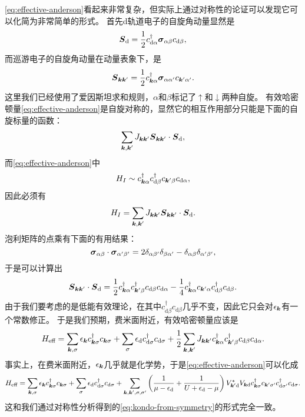 \documentclass[hyperref, UTF8, a4paper]{ctexart}
\begin{document}
\eqref{eq:effective-anderson}看起来非常复杂，但实际上通过对称性的论证可以发现它可以化简为非常简单的形式。
首先d轨道电子的自旋角动量显然是
\[
    {\vb*{S}}_\text{d} = \frac{1}{2} {c}_{\text{d} \alpha}^\dagger \vb*{\sigma}_{\alpha \beta} {c}_{\text{d} \beta},
\]
而巡游电子的自旋角动量在动量表象下，是
\[
    {\vb*{S}}_{\vb*{k} \vb*{k}'} = \frac{1}{2} {c}^\dagger_{\vb*{k} \alpha} \vb*{\sigma}_{\alpha \alpha'} {c}_{\vb*{k}' \alpha'}.
\]
这里我们已经使用了爱因斯坦求和规则，$\alpha$和$\beta$标记了$\uparrow$和$\downarrow$两种自旋。
有效哈密顿量\eqref{eq:effective-anderson}是自旋对称的，显然它的相互作用部分只能是下面的自旋标量的函数：
\[
    \sum_{\vb*{k}, \vb*{k}'} J_{\vb*{k} \vb*{k}'} {\vb*{S}}_{\vb*{k} \vb*{k}'} \cdot {\vb*{S}}_\text{d},
\]
而\eqref{eq:effective-anderson}中
\[
    {H}_I \sim {c}^\dagger_{\vb*{k} \alpha} {c}^\dagger_{\text{d} \beta} {c}_{\vb*{k}' \beta} {c}_{\text{d} \alpha},
\]
因此必须有
\[
    {H}_I = \sum_{\vb*{k}, \vb*{k}'} J_{\vb*{k} \vb*{k}'} {\vb*{S}}_{\vb*{k} \vb*{k}'} \cdot {\vb*{S}}_\text{d}.
\]
泡利矩阵的点乘有下面的有用结果：
\[
    \vb*{\sigma}_{\alpha \beta} \cdot \vb*{\sigma}_{\alpha' \beta'} = 2 \delta_{\alpha \beta'} \delta_{\beta \alpha'} - \delta_{\alpha \beta} \delta_{\alpha' \beta'},
\]
于是可以计算出
\[
    {\vb*{S}}_{\vb*{k} \vb*{k}'} \cdot {\vb*{S}}_\text{d} = \frac{1}{2} {c}^\dagger_{\vb*{k} \alpha} {c}^\dagger_{\vb*{k}' \beta} {c}_{\text{d} \beta} {c}_{\text{d} \alpha} - \frac{1}{4} {c}^\dagger_{\vb*{k} \alpha} {c}_{\vb*{k}' \alpha} {c}^\dagger_{\text{d} \beta} {c}_{\text{d} \beta}.
\]
由于我们要考虑的是低能有效理论，在其中${c}^\dagger_{\text{d} \beta} {c}_{\text{d} \beta}$几乎不变，因此它只会对$\epsilon_{\vb*{k}}$有一个常数修正。
于是我们预期，费米面附近，有效哈密顿量应该是
\begin{equation}
    {H}_\text{eff} = \sum_{\vb*{k}, \sigma} \epsilon_{\vb*{k}} {c}_{\vb*{k}\sigma}^\dagger {c}_{\vb*{k} \sigma} + \sum_\sigma \epsilon_\text{d} {c}_{\text{d}\sigma}^\dagger {c}_{\text{d} \sigma} + \frac{1}{2} \sum_{\vb*{k}, \vb*{k}'} J_{\vb*{k} \vb*{k}'} {c}^\dagger_{\vb*{k} \alpha} {c}^\dagger_{\vb*{k}' \beta} {c}_{\text{d} \beta} {c}_{\text{d} \alpha}.
    \label{eq:kondo-from-symmetry}
\end{equation}
事实上，在费米面附近，$\epsilon_{\vb*{k}}$几乎就是化学势，于是\eqref{eq:effective-anderson}可以化成
\[
    {H}_\text{eff} = \sum_{\vb*{k}, \sigma} \epsilon_{\vb*{k}} {c}_{\vb*{k}\sigma}^\dagger {c}_{\vb*{k} \sigma} + \sum_\sigma \epsilon_\text{d} {c}_{\text{d}\sigma}^\dagger {c}_{\text{d} \sigma} 
    + \sum_{\vb*{k}, \vb*{k}', \sigma, \sigma'} \left( \frac{1}{\mu - \epsilon_\text{d}} + \frac{1}{U + \epsilon_\text{d} - \mu} \right) V_{\vb*{k}' \text{d}}^* V_{\vb*{k} \text{d}} {c}^\dagger_{\vb*{k} \sigma} {c}_{\vb*{k}' \sigma'} {c}^\dagger_{\text{d} \sigma'} {c}_{\text{d} \sigma}.
\]
这和我们通过对称性分析得到的\eqref{eq:kondo-from-symmetry}的形式完全一致。
\end{document}
